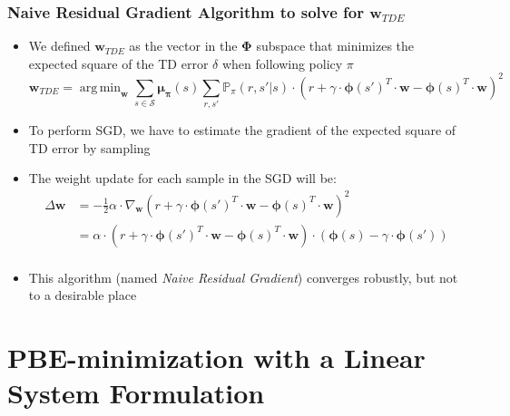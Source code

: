 \documentclass[handout]{beamer}
\newcommand{\bphi}{\bm{\Phi}}
\newcommand{\bmu}{\bm{\mu_{\pi}}}
\newcommand{\bw}{\bm{w}}
\DeclareMathOperator*{\argmin}{arg\,min}
\begin{document}
\begin{frame}
\frametitle{Naive Residual Gradient Algorithm to solve for $\bm{w}_{TDE}$}
\pause
\begin{itemize}[<+->]
\item We defined $\bm{w}_{TDE}$ as the vector in the $\bphi$ subspace that minimizes the expected square of the TD error $\delta$ when following policy $\pi$
$$\bm{w}_{TDE} = \argmin_{\bw} \sum_{s \in \mathcal{S}} \bmu(s) \sum_{r,s'} \mathbb{P}_{\pi}(r, s'|s) \cdot (r + \gamma \cdot \bm{\phi}(s')^T \cdot \bw - \bm{\phi}(s)^T \cdot \bw)^2$$
\item To perform SGD, we have to estimate the gradient of the expected square of TD error by sampling
\item The weight update for each sample in the SGD will be:
\begin{align*}
\Delta \bw & = - \frac{1}{2} \alpha \cdot \nabla_{\bw} (r + \gamma \cdot \bm{\phi}(s')^T \cdot \bw - \bm{\phi}(s)^T \cdot \bw)^2\\
& = \alpha \cdot (r + \gamma \cdot \bm{\phi}(s')^T \cdot \bw - \bm{\phi}(s)^T \cdot \bw) \cdot (\bm{\phi}(s) - \gamma \cdot \bm{\phi}(s'))\\
\end{align*}
\item This algorithm (named {\em Naive Residual Gradient}) converges robustly, but not to a desirable place
\end{itemize}
\end{frame}

\section{PBE-minimization with a Linear System Formulation}
\end{document}
